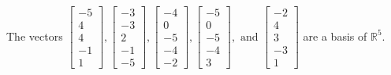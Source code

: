 \begin{exercise}
\begin{exerciseStatement}
  \end{exerciseStatement}
  \begin{exerciseAnswer}
   The vectors \(\left[\begin{array}{r}
-5 \\
4 \\
4 \\
-1 \\
1
\end{array}\right] , \left[\begin{array}{r}
-3 \\
-3 \\
2 \\
-1 \\
-5
\end{array}\right] , \left[\begin{array}{r}
-4 \\
0 \\
-5 \\
-4 \\
-2
\end{array}\right] , \left[\begin{array}{r}
-5 \\
0 \\
-5 \\
-4 \\
3
\end{array}\right] , \text{ and } \left[\begin{array}{r}
-2 \\
4 \\
3 \\
-3 \\
1
\end{array}\right]\) 
  	 are  a basis of \(\mathbb{R}^5\).
  


  \end{exerciseAnswer}
\end{exercise}